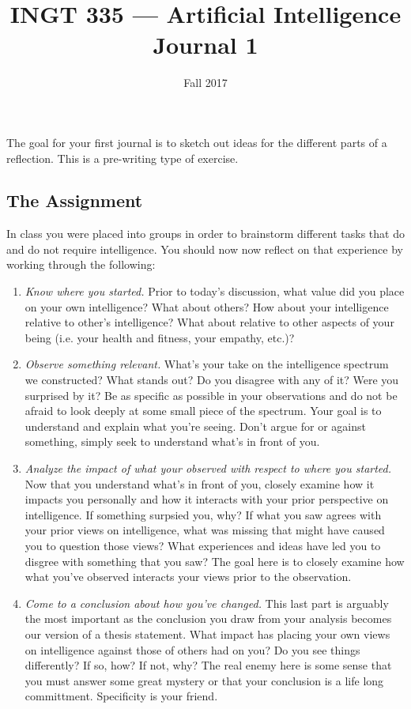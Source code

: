 \documentclass[nobib]{tufte-handout}
\title{INGT 335 --- Artificial Intelligence \\ Journal 1}
\author{}
\date{ Fall 2017 }
\begin{document}
\maketitle


The goal for your first journal is to sketch out ideas for the different parts of a reflection.  This is a pre-writing type of exercise.

\subsection{The Assignment}

In class you were placed into groups in order to brainstorm different tasks that do and do not require intelligence. You should now now reflect on that experience by working through the following:

\begin{enumerate}
  \item \textit{Know where you started.} Prior to today's discussion, what value did you place on your own intelligence? What about others? How about your intelligence relative to other's intelligence? What about relative to other aspects of your being (i.e. your health and fitness, your empathy, etc.)?

  \item \textit{Observe something relevant.} What's your take on the intelligence spectrum we constructed? What stands out? Do you disagree with any of it? Were you surprised by it?  Be as specific as possible in your observations and do not be afraid to look deeply at some small piece of the spectrum. Your goal is to understand and explain what you're seeing.  Don't argue for or against something, simply seek to understand what's in front of you.

  \item \textit{Analyze the impact of what your observed with respect to where you started.}  Now that you understand what's in front of you, closely examine how it impacts you personally and how it interacts with your prior perspective on intelligence. If something surpsied you, why? If what you saw agrees with your prior views on intelligence, what was missing that might have caused you to question those views?  What experiences and ideas have led you to disgree with something that you saw? The goal here is to closely examine how what you've observed interacts your views prior to the observation.

  \item \textit{Come to \textit{a} conclusion about how you've changed.} This last part is arguably the most important as the conclusion you draw from your analysis becomes our version of a thesis statement.  What impact has placing your own views on intelligence against those of others had on you? Do you see things differently? If so, how? If not, why? The real enemy here is some sense that you must answer some great mystery or that your conclusion is a life long committment. Specificity is your friend.

\end{enumerate}
\end{document}
